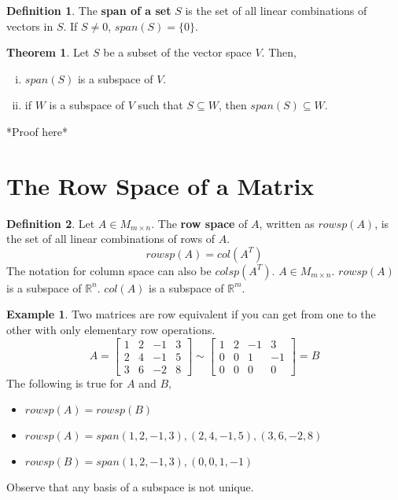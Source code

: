 \documentclass{report}
\theoremstyle{definition}
\newtheorem*{_def}{Definition}
\newtheorem{_thm}{Theorem}[section]
\newtheorem{ex}{Example}[section]
\theoremstyle{remark}
\begin{document}
\begin{_def}
The \textbf{span of a set} $S$ is the set of all linear combinations of vectors in $S$.
If $S\neq 0$, $span(S)=\{0\}$.
\end{_def}

\begin{_thm}
Let $S$ be a subset of the vector space $V$.
Then,
\begin{enumerate}[i)]
 \item $span(S)$ is a subspace of $V$.
 \item if $W$ is a subspace of $V$ such that $S\subseteq W$, then $span(S)\subseteq W$.
\end{enumerate}
\end{_thm}

*Proof here*

\section{The Row Space of a Matrix}

\begin{_def}
Let $A\in M_{m\times n}$.
The \textbf{row space} of $A$, written as $rowsp(A)$, is the set of all linear combinations of rows of $A$.
\[rowsp(A)=col(A^T)\]
The notation for column space can also be $colsp(A^T)$.
$A\in M_{m\times n}$.
$rowsp(A)$ is a subspace of $\mathbb{R}^n$.
$col(A)$ is a subspace of $\mathbb{R}^m$.
\end{_def}

\begin{ex}
Two matrices are row equivalent if you can get from one to the other with only elementary row operations.
\[A=
\begin{bmatrix}
1 & 2 & -1 & 3 \\
2 & 4 & -1 & 5 \\
3 & 6 & -2 & 8
\end{bmatrix}\sim
\begin{bmatrix}
1 & 2 & -1 & 3 \\
0 & 0 & 1 & -1 \\
0 & 0 & 0 & 0
\end{bmatrix}=B
\]
The following is true for $A$ and $B$,
\begin{itemize}
 \item $rowsp(A)=rowsp(B)$
 \item $rowsp(A)=span{(1,2,-1,3),(2,4,-1,5),(3,6,-2,8)}$
 \item $rowsp(B)=span{(1,2,-1,3),(0,0,1,-1)}$
\end{itemize}
Observe that any basis of a subspace is not unique.
\end{ex}
\end{document}
